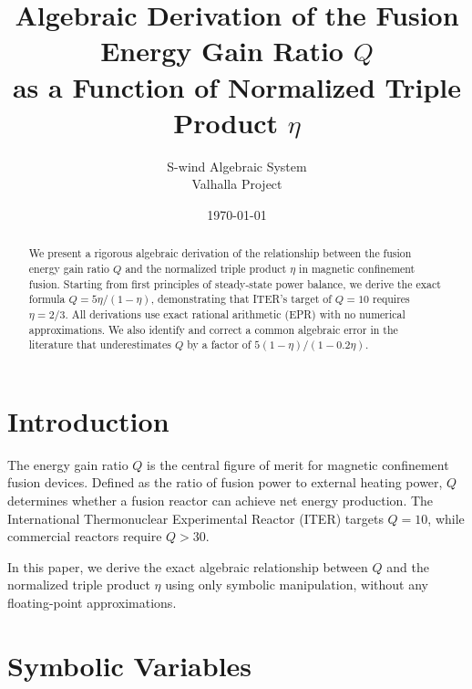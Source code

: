 \documentclass[11pt,a4paper]{article}
\title{Algebraic Derivation of the Fusion Energy Gain Ratio $Q$\\as a Function of Normalized Triple Product $\eta$}
\author{S-wind Algebraic System\\Valhalla Project}
\date{\today}
\begin{document}
\maketitle

\begin{abstract}
We present a rigorous algebraic derivation of the relationship between the fusion energy gain ratio $Q$ and the normalized triple product $\eta$ in magnetic confinement fusion. Starting from first principles of steady-state power balance, we derive the exact formula $Q = 5\eta/(1-\eta)$, demonstrating that ITER's target of $Q=10$ requires $\eta = 2/3$. All derivations use exact rational arithmetic (EPR) with no numerical approximations. We also identify and correct a common algebraic error in the literature that underestimates $Q$ by a factor of $5(1-\eta)/(1-0.2\eta)$.
\end{abstract}

\section{Introduction}

The energy gain ratio $Q$ is the central figure of merit for magnetic confinement fusion devices. Defined as the ratio of fusion power to external heating power, $Q$ determines whether a fusion reactor can achieve net energy production. The International Thermonuclear Experimental Reactor (ITER) targets $Q = 10$, while commercial reactors require $Q > 30$.

In this paper, we derive the exact algebraic relationship between $Q$ and the normalized triple product $\eta$ using only symbolic manipulation, without any floating-point approximations.

\section{Symbolic Variables}
\end{document}
